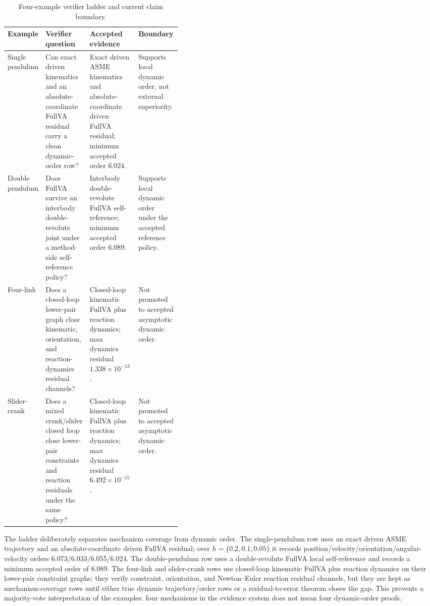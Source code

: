 \documentclass[10pt]{article}
\begin{document}
\begin{table}[!htbp]
\centering
\caption{Four-example verifier ladder and current claim boundary.}
\label{tab:examples}
\small
\begin{tabularx}{\linewidth}{p{0.18\linewidth}p{0.22\linewidth}YY}
\toprule
\textbf{Example} & \textbf{Verifier question} & \textbf{Accepted evidence} & \textbf{Boundary} \\
\midrule
Single pendulum & Can exact driven kinematics and an absolute-coordinate
FullVA residual carry a clean dynamic-order row? & Exact driven ASME
kinematics and absolute-coordinate driven FullVA residual; minimum accepted
order 6.024. & Supports local dynamic order, not external superiority. \\
Double pendulum & Does FullVA survive an interbody double-revolute joint under
a method-side self-reference policy? & Interbody double-revolute FullVA
self-reference; minimum accepted order 6.089. & Supports local dynamic order
under the accepted reference policy. \\
Four-link & Does a closed-loop lower-pair graph close kinematic, orientation,
and reaction-dynamics residual channels? & Closed-loop kinematic FullVA plus
reaction dynamics; max dynamics residual $1.338\times10^{-13}$. & Not promoted
to accepted asymptotic dynamic order. \\
Slider-crank & Does a mixed crank/slider closed loop close lower-pair
constraints and reaction residuals under the same policy? & Closed-loop
kinematic FullVA plus reaction dynamics; max dynamics residual
$6.492\times10^{-15}$. & Not promoted to accepted asymptotic dynamic order. \\
\bottomrule
\end{tabularx}
\end{table}

The ladder deliberately separates mechanism coverage from dynamic order. The
single-pendulum row uses an exact driven ASME trajectory and an
absolute-coordinate driven FullVA residual; over $h=\{0.2,0.1,0.05\}$ it
records position/velocity/orientation/angular-velocity orders
6.073/6.033/6.055/6.024. The double-pendulum row uses a double-revolute
FullVA local self-reference and records a minimum accepted order of 6.089. The
four-link and slider-crank rows use closed-loop kinematic FullVA plus reaction
dynamics on their lower-pair constraint graphs; they verify constraint,
orientation, and Newton--Euler reaction residual channels, but they are kept
as mechanism-coverage rows until either true dynamic trajectory/order rows or
a residual-to-error theorem closes the gap. This prevents a majority-vote
interpretation of the examples: four mechanisms in the evidence system does
not mean four dynamic-order proofs.
\end{document}
